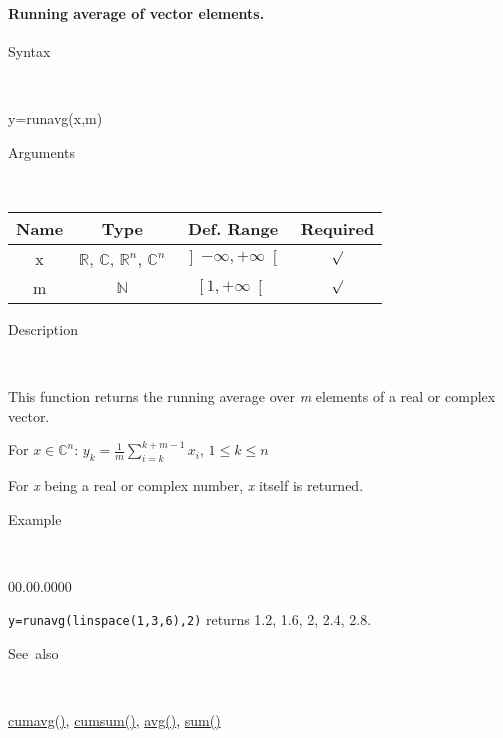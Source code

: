 \paragraph{\label{par:Running-average}Running average of vector elements.}

\begin{description}
\item [Syntax]~
\end{description}
y=runavg(x,m)

\begin{description}
\item [Arguments]~
\end{description}
\begin{tabular}{|c|c|c|c|}
\hline 
Name&
Type&
Def. Range&
Required\tabularnewline
\hline
\hline 
x&
$\mathbb{R}$, $\mathbb{C}$, $\mathbb{R}^{n}$, $\mathbb{C}^{n}$&
$\left]-\infty,+\infty\right[$&
$\surd$\tabularnewline
\hline
m&
$\mathbb{N}$&
$\left[1,+\infty\right[$&
$\surd$\tabularnewline
\hline
\end{tabular}

\begin{description}
\item [Description]~
\end{description}
This function returns the running average over \textit{m} elements
of a real or complex vector.

\medskip{}
For $x\in$$\mathbb{C}^{n}$: $y_{k}=$${\displaystyle \frac{1}{m}}$$\sum\limits _{i=k}^{k+m-1}x_{i}$,
$1\leq k\leq n$
\medskip{}

For \textit{x} being a real or complex number, \textit{x}
itself is returned.

\begin{description}
\item [Example]~
\end{description}
\begin{lyxlist}{00.00.0000}
\item [\texttt{y=runavg(linspace(1,3,6),2)}]returns 1.2, 1.6, 2, 2.4, 2.8.
\end{lyxlist}
\begin{description}
\item [See~also]~
\end{description}
\textcolor{blue}{\hyperlink{cumavg}{cumavg()}}\textcolor{black}{,}
\textcolor{blue}{\hyperlink{cumsum}{cumsum()}}\textcolor{black}{,}
\textcolor{blue}{\hyperlink{avg}{avg()}}\textcolor{black}{,} \textcolor{blue}{\hyperlink{sum}{sum()}}


\newpage

